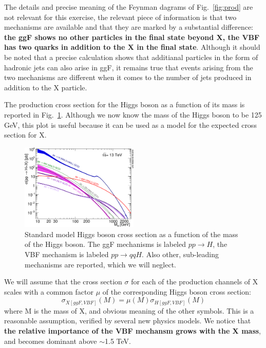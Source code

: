 \documentclass[a4paper,12pt]{article}
\begin{document}
The details and precise meaning of the Feynman dagrams of Fig.~\ref{fig:prod}
are not relevant for this exercise, the relevant piece of information is that
two mechanisms are available and that they are marked by a substantial
difference: {\bf the ggF shows no other particles in the final state beyond X,
the VBF has two quarks in addition to the X in the final state}.
Although it should be noted that a precise calculation shows that additianal
particles in the form of hadronic jets can also arise in ggF, it remains true
that events arising from the two mechanisms are different when it comes to the
number of jets produced in addition to the X particle.

The production cross section for the Higgs boson as a function of its mass is
reported in Fig.~\ref{fig:production}. Although we now know the mass of the
Higgs boson to be 125 GeV, this plot is useful because it can be used as a
model for the expected cross section for X.
\begin{figure}
 \centering 
 \includegraphics[width=0.5\textwidth]{images/plotAll_13tev_BSM_sqrt.png}
 \caption{Standard model Higgs boson cross section as a function of the mass
 of the Higgs boson. The ggF mechanisms is labeled $pp\rightarrow{}H$, the VBF
 mechanism is labeled $pp\rightarrow{}qqH$. Also other, sub-leading mechanisms
 are reported, which we will neglect.\label{fig:production}}
\end{figure}

We will assume that the cross section $\sigma$ for each of the production
channels of X scales with a common factor $\mu$ of the corresponding Higgs
boson cross section: 
\begin{equation}
 \sigma_{X [ggF,VBF]}(M) = \mu(M)\sigma_{H [ggF,VBF]}(M)
 \label{eq:mudef}
\end{equation}
 where M is the mass of X, and obvious meaning of the other symbols. This is a
 reasonable assumption, verified by several new physics models.  We notice
 that {\bf the relative importance of the VBF mechansm grows with the X mass},
 and becomes dominant above $\sim$1.5 TeV.
 
\end{document}
